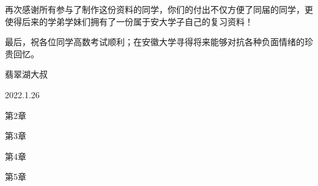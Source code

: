 \documentclass{article}
\begin{document}
	再次感谢所有参与了制作这份资料的同学，你们的付出不仅方便了同届的同学，更使得后来的学弟学妹们拥有了一份属于安大学子自己的复习资料！
	
	最后，祝各位同学高数考试顺利；在安徽大学寻得将来能够对抗各种负面情绪的珍贵回忆。
	
	\vskip 3cm
	\hfill 翡翠湖大叔
	
	\hfill 2022.1.26
	
	
	
	\newpage
	\mbox{}
	\vspace{4cm}
	\begin{center}
		第2章
	\end{center}
	
	
	
	
	
	
	
	
	\newpage
	\mbox{}
	\vspace{4cm}
	\begin{center}
		第3章
	\end{center}
	
	
	
	
	
	
	\newpage
	\mbox{}
	\vspace{4cm}
	\begin{center}
		第4章
	\end{center}
	
	
	
	
	
	
	
	\newpage
	\mbox{}
	\vspace{4cm}
	\begin{center}
		第5章
	\end{center}
	
	
	
	
	
	
\end{document}
